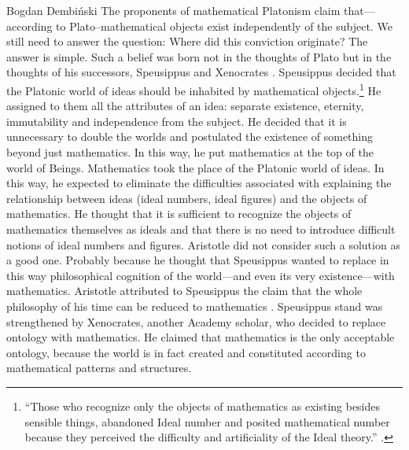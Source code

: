 \begin{artengenv}{Bogdan Dembiński}
The proponents of mathematical Platonism claim that---according to Plato–mathematical %
objects exist independently of the subject. We still need to answer the question: Where did this conviction  %
originate?%
The answer is simple. Such a belief was born not in the thoughts of Plato but in the thoughts of his successors,
Speusippus and Xenocrates
\parencite[see][]{dembinski_pozny_2010,dillon_heirs_2003}.
Speusippus decided that the Platonic world of ideas should be inhabited by mathematical
objects.\footnote{``Those who recognize
only the objects of mathematics as existing besides sensible things, abandoned Ideal number and posited mathematical
number because they perceived the difficulty and artificiality of the Ideal theory.''
\parencite[Methaphysics, 1086a]{aristotle_aristotles_1924}.
} He assigned to
them all the attributes of an idea: separate existence, eternity, immutability and independence from the subject. He
decided that it is unnecessary to double the worlds and postulated the existence of something beyond just mathematics.
In this way, he put mathematics at the top of the %
world of Beings. Mathematics took the place of the Platonic world of ideas. In this way, he expected to eliminate the
difficulties associated with explaining the relationship between ideas (ideal numbers, ideal figures) and the objects
of mathematics. He thought that it is sufficient to recognize the objects of mathematics themselves as ideals and that
there is no need to introduce difficult notions of ideal numbers and figures. Aristotle did not consider such a
solution as a good one. Probably because he thought that Speusippus wanted to replace in this way philosophical
cognition of the world---and even its very existence---with mathematics. Aristotle attributed to Speusippus the
claim that the whole philosophy of his time can be reduced to mathematics
\parencite[Methaphysics, 992a30]{aristotle_aristotles_1924}.
Speusippus stand was strengthened by Xenocrates, another Academy scholar, who decided to replace
ontology with mathematics. He claimed that mathematics is the only acceptable ontology, because the world is in fact
created and constituted according to mathematical patterns and structures.


\end{artengenv}
